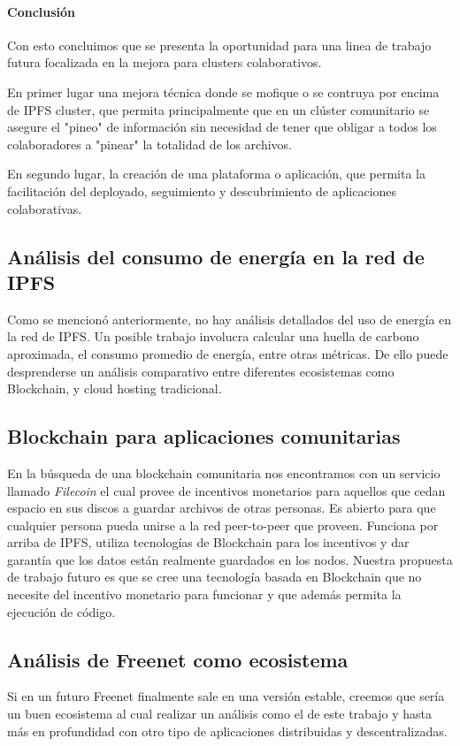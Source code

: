 \paragraph{Conclusión}

Con esto concluimos que se presenta la oportunidad para una linea de trabajo futura focalizada en la mejora para clusters colaborativos. 

En primer lugar una mejora técnica donde se mofique o se contruya por encima de IPFS cluster, que permita principalmente que en un clúster comunitario se asegure el "pineo" de información sin necesidad de tener que obligar a todos los colaboradores a "pinear" la totalidad de los archivos.

En segundo lugar, la creación de una plataforma o aplicación, que permita la facilitación del deployado, seguimiento y descubrimiento de aplicaciones colaborativas.

\subsection{Análisis del consumo de energía en la red de IPFS}

Como se mencionó anteriormente, no hay análisis detallados del uso de energía en la red de IPFS. Un posible trabajo involucra calcular una huella de carbono aproximada, el consumo promedio de energía, entre otras métricas. De ello puede desprenderse un análisis comparativo entre diferentes ecosistemas como Blockchain, y cloud hosting tradicional.

\subsection{Blockchain para aplicaciones comunitarias}

En la búsqueda de una blockchain comunitaria nos encontramos con un servicio llamado \textit{Filecoin}\cite{filecoin} el cual provee de incentivos monetarios para aquellos que cedan espacio en sus discos a guardar archivos de otras personas. Es abierto para que cualquier persona pueda unirse a la red peer-to-peer que proveen. Funciona por arriba de IPFS, utiliza tecnologías de Blockchain para los incentivos y dar garantía que los datos están realmente guardados en los nodos. Nuestra propuesta de trabajo futuro es que se cree una tecnología basada en Blockchain que no necesite del incentivo monetario para funcionar y que además permita la ejecución de código.

\subsection{Análisis de Freenet como ecosistema}

Si en un futuro Freenet finalmente sale en una versión estable, creemos que sería un buen ecosistema al cual realizar un análisis como el de este trabajo y hasta más en profundidad con otro tipo de aplicaciones distribuidas y descentralizadas.
